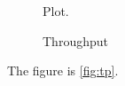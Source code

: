 \documentclass{article}
\begin{document}
\begin{figure}[h]
\centering
Plot.
\caption{Throughput}\label{fig:tp}
\end{figure}
The figure  is \autoref{fig:tp}.
\end{document}
